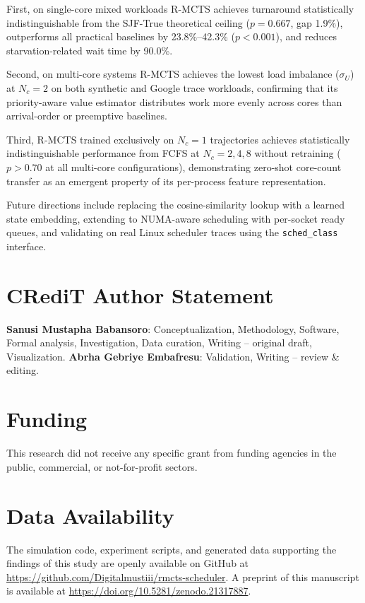 \documentclass[10pt,journal,compsoc]{IEEEtran}
\begin{document}
First, on single-core mixed workloads R-MCTS achieves turnaround
statistically indistinguishable from the SJF-True theoretical ceiling
($p{=}0.667$, gap 1.9\%), outperforms all practical baselines by
23.8\%--42.3\% ($p{<}0.001$), and reduces starvation-related wait
time by 90.0\%.

Second, on multi-core systems R-MCTS achieves the lowest load imbalance
($\sigma_U$) at $N_c{=}2$ on both synthetic and Google trace workloads,
confirming that its priority-aware value estimator distributes work
more evenly across cores than arrival-order or preemptive baselines.

Third, R-MCTS trained exclusively on $N_c{=}1$ trajectories achieves
statistically indistinguishable performance from FCFS at $N_c{=}2,4,8$
without retraining ($p{>}0.70$ at all multi-core configurations),
demonstrating zero-shot core-count transfer as an emergent property of
its per-process feature representation.

Future directions include replacing the cosine-similarity lookup with a
learned state embedding, extending to NUMA-aware scheduling with
per-socket ready queues, and validating on real Linux scheduler traces
using the \texttt{sched\_class} interface.

\section*{CRediT Author Statement}

\textbf{Sanusi Mustapha Babansoro}: Conceptualization, Methodology,
Software, Formal analysis, Investigation, Data curation, Writing --
original draft, Visualization.
\textbf{Abrha Gebriye Embafresu}: Validation, Writing -- review \&
editing.

\section*{Funding}

This research did not receive any specific grant from funding agencies
in the public, commercial, or not-for-profit sectors.

\section*{Data Availability}

The simulation code, experiment scripts, and generated data supporting
the findings of this study are openly available on GitHub at
\url{https://github.com/Digitalmustiii/rmcts-scheduler}.
A preprint of this manuscript is available at
\url{https://doi.org/10.5281/zenodo.21317887}.
\end{document}
